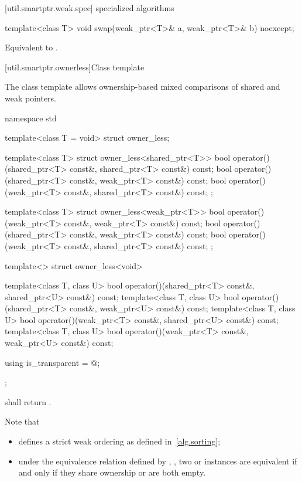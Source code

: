 [util.smartptr.weak.spec]{ specialized algorithms}

%
\begin{itemdecl}
template<class T> void swap(weak_ptr<T>& a, weak_ptr<T>& b) noexcept;
\end{itemdecl}

\begin{itemdescr}
\pnum\effects  Equivalent to .
\end{itemdescr}

[util.smartptr.ownerless]{Class template }

\pnum
The class template  allows ownership-based mixed comparisons of shared
and weak pointers.

%
\begin{codeblock}
namespace std {
  template<class T = void> struct owner_less;

  template<class T> struct owner_less<shared_ptr<T>> {
    bool operator()(shared_ptr<T> const&, shared_ptr<T> const&) const;
    bool operator()(shared_ptr<T> const&, weak_ptr<T> const&) const;
    bool operator()(weak_ptr<T> const&, shared_ptr<T> const&) const;
  };

  template<class T> struct owner_less<weak_ptr<T>> {
    bool operator()(weak_ptr<T> const&, weak_ptr<T> const&) const;
    bool operator()(shared_ptr<T> const&, weak_ptr<T> const&) const;
    bool operator()(weak_ptr<T> const&, shared_ptr<T> const&) const;
  };

  template<> struct owner_less<void> {
    template<class T, class U>
      bool operator()(shared_ptr<T> const&, shared_ptr<U> const&) const;
    template<class T, class U>
      bool operator()(shared_ptr<T> const&, weak_ptr<U> const&) const;
    template<class T, class U>
      bool operator()(weak_ptr<T> const&, shared_ptr<U> const&) const;
    template<class T, class U>
      bool operator()(weak_ptr<T> const&, weak_ptr<U> const&) const;

    using is_transparent = @\unspec@;
  };
}
\end{codeblock}

%
\pnum {} shall return . \begin{note}
Note that

\begin{itemize}
\item {} defines a strict weak ordering as defined in~\ref{alg.sorting};

\item under the equivalence relation defined by ,
, two  or
 instances are equivalent if and only if they share ownership or are
both empty.
\end{itemize} \end{note}

